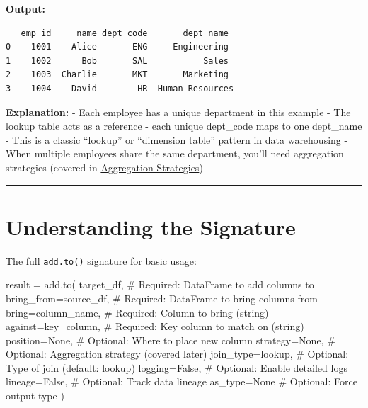 \documentclass[
  letterpaper,
]{scrbook}
\newenvironment{Shaded}{\begin{snugshade}}{\end{snugshade}}
\newcommand{\CommentTok}[1]{\textcolor[rgb]{0.37,0.37,0.37}{#1}}
\newcommand{\NormalTok}[1]{\textcolor[rgb]{0.00,0.23,0.31}{#1}}
\newcommand{\OperatorTok}[1]{\textcolor[rgb]{0.37,0.37,0.37}{#1}}
\newcommand{\StringTok}[1]{\textcolor[rgb]{0.13,0.47,0.30}{#1}}
\newcommand{\VariableTok}[1]{\textcolor[rgb]{0.07,0.07,0.07}{#1}}
\begin{document}
\textbf{Output:}

\begin{verbatim}
   emp_id     name dept_code       dept_name
0    1001    Alice       ENG     Engineering
1    1002      Bob       SAL           Sales
2    1003  Charlie       MKT       Marketing
3    1004    David        HR  Human Resources
\end{verbatim}

\textbf{Explanation:} - Each employee has a unique department in this
example - The lookup table acts as a reference - each unique dept\_code
maps to one dept\_name - This is a classic ``lookup'' or ``dimension
table'' pattern in data warehousing - When multiple employees share the
same department, you'll need aggregation strategies (covered in
\href{examples-to-04-strategy.html}{Aggregation Strategies})

\begin{center}\rule{0.5\linewidth}{0.5pt}\end{center}

\section{Understanding the Signature}\label{understanding-the-signature}

The full \texttt{add.to()} signature for basic usage:

\begin{Shaded}
\begin{Highlighting}[]
\NormalTok{result }\OperatorTok{=}\NormalTok{ add.to(}
\NormalTok{    target\_df,                   }\CommentTok{\# Required: DataFrame to add columns to}
\NormalTok{    bring\_from}\OperatorTok{=}\NormalTok{source\_df,        }\CommentTok{\# Required: DataFrame to bring columns from}
\NormalTok{    bring}\OperatorTok{=}\StringTok{\textquotesingle{}column\_name\textquotesingle{}}\NormalTok{,         }\CommentTok{\# Required: Column to bring (string)}
\NormalTok{    against}\OperatorTok{=}\StringTok{\textquotesingle{}key\_column\textquotesingle{}}\NormalTok{,        }\CommentTok{\# Required: Key column to match on (string)}
\NormalTok{    position}\OperatorTok{=}\VariableTok{None}\NormalTok{,               }\CommentTok{\# Optional: Where to place new column}
\NormalTok{    strategy}\OperatorTok{=}\VariableTok{None}\NormalTok{,               }\CommentTok{\# Optional: Aggregation strategy (covered later)}
\NormalTok{    join\_type}\OperatorTok{=}\StringTok{\textquotesingle{}lookup\textquotesingle{}}\NormalTok{,          }\CommentTok{\# Optional: Type of join (default: \textquotesingle{}lookup\textquotesingle{})}
\NormalTok{    logging}\OperatorTok{=}\VariableTok{False}\NormalTok{,               }\CommentTok{\# Optional: Enable detailed logs}
\NormalTok{    lineage}\OperatorTok{=}\VariableTok{False}\NormalTok{,               }\CommentTok{\# Optional: Track data lineage}
\NormalTok{    as\_type}\OperatorTok{=}\VariableTok{None}                 \CommentTok{\# Optional: Force output type}
\NormalTok{)}
\end{Highlighting}
\end{Shaded}
\end{document}
